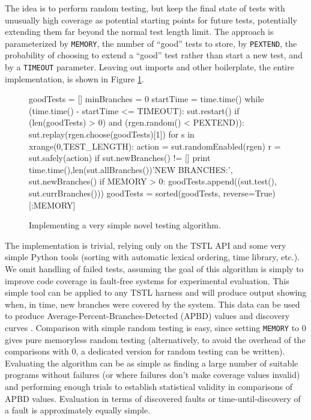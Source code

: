 The idea is to perform random testing, but keep the final state of tests with unusually high coverage as potential starting points for future tests, potentially extending them far beyond the normal test length limit.  The approach is parameterized by {\tt MEMORY}, the number of ``good'' tests to store, by {\tt PEXTEND}, the probability of choosing to extend a ``good'' test rather than start a new test, and by a {\tt TIMEOUT} parameter.  Leaving out imports and other boilerplate, the entire implementation, is shown in Figure \ref{fig:keepgood}.

\begin{figure}
{\scriptsize
\begin{code}
goodTests = []
minBranches = 0
startTime = time.time()
while (time.time() - startTime <= TIMEOUT):
   sut.restart()
   if (len(goodTests) > 0) and (rgen.random() < PEXTEND)):
     sut.replay(rgen.choose(goodTests)[1])
   for s in xrange(0,TEST\_LENGTH): 
      action = sut.randomEnabled(rgen)
      r = sut.safely(action)
      if sut.newBranches() != []
         print time.time(),len(sut.allBranches())'NEW BRANCHES:', sut.newBranches()
   if MEMORY > 0:
      goodTests.append((sut.test(), sut.currBranches()))
      goodTests = sorted(goodTests, reverse=True)[:MEMORY]
\end{code}
}
\caption{Implementing a very simple novel testing algorithm.}
\label{fig:keepgood}
\end{figure}

The implementation is trivial, relying only on the TSTL API and some very simple Python tools (sorting with automatic lexical ordering, time library, etc.).  We omit handling of failed tests, assuming the goal of this algorithm is simply to improve code coverage in fault-free systems for experimental evaluation.  This simple tool can be applied to any TSTL harness and will produce output showing when, in time, new branches were covered by the system.  This data can be used to produce Average-Percent-Branches-Detected (APBD) values and discovery curves \cite{issta14}. Comparison with simple random testing is easy, since setting {\tt MEMORY} to 0 gives pure memoryless random testing (alternatively, to avoid the overhead of the comparisons with 0, a dedicated version for random testing can be written).  Evaluating the algorithm can be as simple as finding a large number of suitable programs without failures (or where failures don't make coverage values invalid) and performing enough trials to establish statistical validity in comparisons of APBD values.  Evaluation in terms of discovered faults or time-until-discovery of a fault is approximately equally simple.